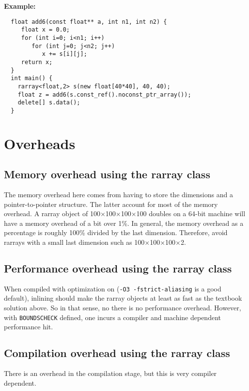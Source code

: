 \documentclass[12pt,twoside]{article}
\begin{document}
\noindent
{\bf Example:}
\vspace{-5pt}\begin{framed}\vspace{-14pt}%
\begin{verbatim}
  float add6(const float** a, int n1, int n2) {
     float x = 0.0;
     for (int i=0; i<n1; i++)
        for (int j=0; j<n2; j++)
           x += s[i][j];
     return x;
  }
  int main() {
    rarray<float,2> s(new float[40*40], 40, 40);
    float z = add6(s.const_ref().noconst_ptr_array());
    delete[] s.data();
  }
\end{verbatim}\vspace{-14pt}
\end{framed}

\section{Overheads}

\subsection{Memory overhead using the rarray class}

The memory overhead here comes from having to store the dimensions and a pointer-to-pointer structure.  The latter account for most of the memory overhead.   A rarray object of 100$\times$100$\times$100$\times$100  doubles on a 64-bit machine will have a memory overhead of a bit over 1\%. In general, the memory overhead as a percentage is roughly 100\% divided by the last dimension. Therefore, avoid rarrays with a small last dimension such as 100$\times$100$\times$100$\times$2.

\subsection{Performance overhead using the rarray class}

When compiled with optimization on (\texttt{-O3 -fstrict-aliasing} is a good default), inlining should make the rarray objects at least as fast as the textbook solution above. %
So in that sense, no there is no performance overhead.  
However, with \texttt{{\tt BOUNDSCHECK}} defined, one incurs a compiler and machine dependent performance hit.


\subsection{Compilation overhead using the rarray class}

There is an overhead in the compilation stage, but this is very compiler dependent.
\end{document}
